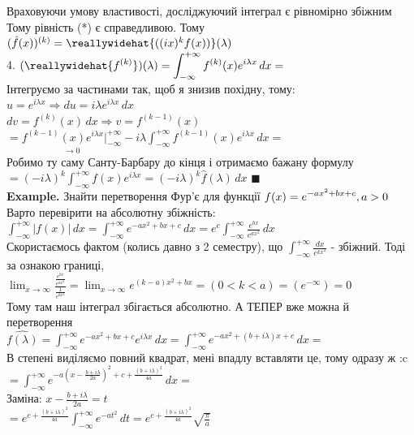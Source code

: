 \documentclass{math_library}
\begin{document}
Враховуючи умову властивості, досліджуючий інтеграл є рівномірно збіжним\\
Тому рівність (*) є справедливою. Тому\\
$(\hat{f}(x))^{(k)} = \reallywidehat{((ix)^k f(x))}(\lambda)$
\bigskip \\
4. $\displaystyle (\reallywidehat{f^{(k)}})(\lambda) = \int_{-\infty}^{+\infty} f^{(k)}(x)e^{i \lambda x}\,dx = $\\
Інтегруємо за частинами так, щоб я знизив похідну, тому:\\
$u = e^{i \lambda x} \Rightarrow du = i \lambda e^{i \lambda x}\,dx$\\
$dv = f^{(k)}(x)\,dx \Rightarrow v = f^{(k-1)}(x)$\\
$\displaystyle = \underset{\to 0}{f^{(k-1)}(x) e^{i \lambda x}\Big|_{-\infty}^{+\infty}} -i \lambda \int_{-\infty}^{+\infty} f^{(k-1)}(x) e^{i \lambda x}\,dx = $\\
Робимо ту саму Санту-Барбару до кінця і отримаємо бажану формулу\\
$\displaystyle = (-i\lambda)^k \int_{-\infty}^{+\infty} f(x)e^{i \lambda x} = (-i\lambda)^k \hat{f}(\lambda)\,dx$ $\blacksquare$
\bigskip \\
\textbf{Example.} Знайти перетворення Фур'є для функції $\displaystyle f(x)=e^{-ax^2+bx+c},\\ a>0$\\
Варто перевірити на абсолютну збіжність:\\
$\displaystyle \int_{-\infty}^{+\infty} |f(x)|\,dx = \int_{-\infty}^{+\infty} e^{-ax^2+bx+c} \,dx = e^c \int_{-\infty}^{+\infty} \frac{e^{bx}}{e^{ax^2}} \,dx$\\
Скористаємось фактом (колись давно з 2 семестру), що $\displaystyle \int_{-\infty}^{+\infty} \frac{dx}{e^{kx^2}}$ - збіжний. Тоді за ознакою границі,\\
$\displaystyle \lim_{x \to \infty} \frac{\displaystyle \frac{e^{bx}}{e^{ax^2}}}{\displaystyle \frac{1}{e^{kx^2}}} = \lim_{x \to \infty} e^{(k-a)x^2 +bx} = (0<k<a) = (e^{-\infty}) = 0$\\
Тому там наш інтеграл збігається абсолютно. А ТЕПЕР вже можна й перетворення\\
$\hat{f(\lambda)} = \displaystyle \int_{-\infty}^{+\infty} e^{-ax^2+bx+c} e^{i \lambda x}\,dx = \int_{-\infty}^{+\infty} e^{-ax^2+(b+ i\lambda)x+c} \,dx =$\\
В степені виділяємо повний квадрат, мені впадлу вставляти це, тому одразу ж :c\\
$= \displaystyle \int_{-\infty}^{+\infty} e^{\textstyle -a\left(x - \frac{b+i\lambda}{2a} \right)^2 + c + \frac{(b+i\lambda)^2}{4a}} \,dx = $\\
Заміна: $\displaystyle x-\frac{b+i\lambda}{2a} = t$\\
$= \displaystyle e^{\textstyle c + \frac{(b+i\lambda)^2}{4a}} \int_{-\infty}^{+\infty} e^{\textstyle -at^2} \,dt = e^{\textstyle c + \frac{(b+i\lambda)^2}{4a}} \sqrt{\frac{\pi}{a}}$
\bigskip \\
\end{document}
